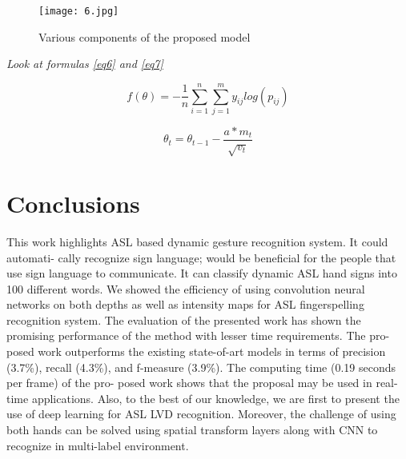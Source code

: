 \documentclass[
  manuscript=article,  %
  layout=preprint,  %
  year=20xx,
  volume=x,
]{joas}
\begin{document}
\begin{figure}[h!]
    \centering
    \texttt{[image: 6.jpg]}
    \caption{Various components of the proposed model}
    \label{f3}
\end{figure}

\par {\Huge \emph{Look at formulas \ref{eq6} and \ref{eq7}}}



\begin{equation}
f(\theta)=-\frac{1}{n}\sum^n_{i=1}\sum^m_{j=1}y_{ij}log(p_{ij})\label{eq6}
\end{equation}

\begin{equation}
    \theta_{t}=\theta_{t-1}-\frac{a*m_{t}}{\sqrt{v_{t}}}\label{eq7}
\end{equation}



\section{Conclusions}
This work highlights ASL based dynamic gesture recognition system. It could automati- cally recognize sign language; would be beneficial for the people that use sign language to communicate. It can classify dynamic ASL hand signs into 100 different words. We showed the efficiency of using convolution neural networks on both depths as well as intensity maps for ASL fingerspelling recognition system. The evaluation of the presented work has shown the promising performance of the method with lesser time requirements. The pro- posed work outperforms the existing state-of-art models in terms of precision (3.7\%), recall (4.3\%), and f-measure (3.9\%). The computing time (0.19 seconds per frame) of the pro- posed work shows that the proposal may be used in real-time applications. Also, to the best of our knowledge, we are first to present the use of deep learning for ASL LVD recognition. Moreover, the challenge of using both hands can be solved using spatial transform layers along with CNN to recognize in multi-label environment.




\end{document}
